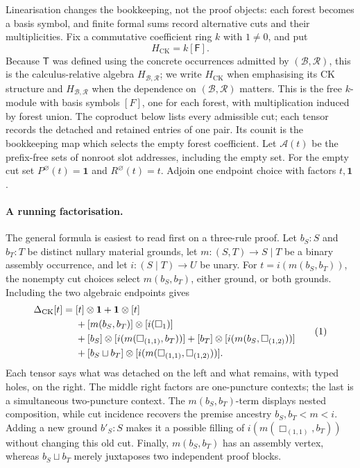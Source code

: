 \documentclass[10pt,a4paper]{article}
\theoremstyle{plain}
\theoremstyle{definition}
\theoremstyle{remark}
\newcommand{\Base}{\mathcal B}
\newcommand{\Rules}{\mathcal R}
\newcommand{\Trees}{\mathsf T}
\newcommand{\Forests}{\mathsf F}
\newcommand{\HCK}{H_{\mathrm{CK}}}
\newcommand{\Hlic}{H_{\Base,\Rules}}
\newcommand{\DeltaCK}{\Delta_{\mathrm{CK}}}
\newcommand{\fjoin}{\mathbin{\sqcup}}
\newcommand{\one}{\mathbf 1}
\newcommand{\eqtag}{\refstepcounter{equation}\tag{\theequation}}
\begin{document}
Linearisation changes the bookkeeping, not the proof objects: each forest
becomes a basis symbol, and finite formal sums record alternative cuts and
their multiplicities.  Fix a commutative coefficient ring \(k\) with
\(1\ne0\), and put
\[
                   \HCK=k[\Forests].
\]
Because \(\Trees\) was defined using the concrete occurrences admitted by
\((\Base,\Rules)\), this is the calculus-relative algebra \(\Hlic\); we
write \(\HCK\) when emphasising its CK
structure and \(\Hlic\) when the dependence on \((\Base,\Rules)\) matters.
This is the free \(k\)-module with basis symbols \([F]\), one for each
forest, with multiplication induced by forest union.  The coproduct below
lists every admissible cut; each tensor records the detached and retained
entries of one pair.  Its counit is the bookkeeping map which selects the
empty forest coefficient.  Let
\(\mathcal A(t)\) be the prefix-free
sets of nonroot slot addresses, including the empty set.  For the empty
cut set
\(
 P^\varnothing(t)=\one
\)
and
\(
 R^\varnothing(t)=t
\).
Adjoin one endpoint choice with factors \(t,\one\).

\paragraph{A running factorisation.}
The general formula is easiest to read first on a three-rule proof.  Let
\(b_S:S\) and \(b_T:T\) be distinct nullary material grounds, let
\(m:(S,T)\to S\mid T\) be a binary assembly occurrence, and let
\(i:(S\mid T)\to U\) be unary.  For \(t=i(m(b_S,b_T))\), the nonempty
cut choices select \(m(b_S,b_T)\), either ground, or both grounds.  Including
the two algebraic endpoints gives
\[
\begin{aligned}
 \DeltaCK[t]={}&[t]\otimes\one+\one\otimes[t]\\
 &+[m(b_S,b_T)]\otimes[i(\Box_1)]\\
 &+[b_S]\otimes[i(m(\Box_{(1,1)},b_T))]
   +[b_T]\otimes[i(m(b_S,\Box_{(1,2)}))]\\
 &+[b_S\fjoin b_T]\otimes[i(m(\Box_{(1,1)},\Box_{(1,2)}))].
\end{aligned}
\eqtag\label{eq:running-coproduct}
\]
Each tensor says what was detached on the left and what remains, with
typed holes, on the right.  The middle right factors are one-puncture
contexts; the last is a simultaneous two-puncture context.  The
\(m(b_S,b_T)\)-term displays nested composition, while cut incidence
recovers the premise ancestry \(b_S,b_T<m<i\).  Adding a new ground
\(b'_S:S\) makes it a possible filling of
\(i(m(\Box_{(1,1)},b_T))\) without changing this old cut.  Finally,
\(m(b_S,b_T)\) has an assembly vertex, whereas
\(b_S\fjoin b_T\) merely juxtaposes two independent proof blocks.
\end{document}
